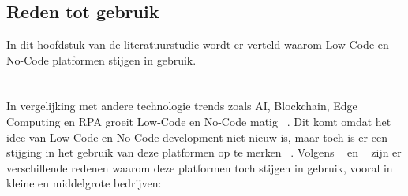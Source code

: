 \chapter{}%
\label{ch:stand-van-zaken}


\section{Reden tot gebruik}%
\label{sec:reden-tot-gebruik}
In dit hoofdstuk van de literatuurstudie wordt er verteld waarom Low-Code en No-Code platformen stijgen in gebruik.
\\
\\
\\
In vergelijking met andere technologie trends zoals AI, Blockchain, Edge Computing en RPA groeit Low-Code en No-Code matig ~\autocite{Kulkarni_2021}.
Dit komt omdat het idee van Low-Code en No-Code development niet nieuw is, maar toch is er een stijging in het gebruik van deze platformen op te merken ~\autocite{Elshan2023}.
Volgens ~\textcite{Elshan2023} en ~\textcite{Kulkarni_2021} zijn er verschillende redenen waarom deze platformen toch stijgen in gebruik, vooral in kleine en middelgrote bedrijven:
